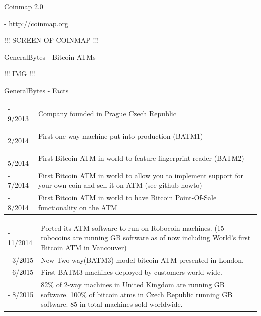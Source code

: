 \documentclass{beamer}
\begin{document}
\begin{frame}

    {\LARGE Coinmap 2.0}\\

    \vspace{5mm}

    - \url{http://coinmap.org}

    !!! SCREEN OF COINMAP !!!  %

\end{frame}

\begin{frame}

    {\LARGE GeneralBytes - Bitcoin ATMs}\\

    \vspace{5mm}

    !!! IMG !!!  %


\end{frame}

\begin{frame}

    {\LARGE GeneralBytes - Facts}\\

    \vspace{5mm}

    \begin{tabular}{lp{8cm}}
    - 9/2013 & Company founded in Prague Czech Republic\\
    - 2/2014 & First one-way machine put into production (BATM1)\\
    - 5/2014 & First Bitcoin ATM in world to feature fingerprint reader (BATM2)\\
    - 7/2014 & First Bitcoin ATM in world to allow you to implement support for your own coin and sell it on ATM (see github howto)\\
    - 8/2014 & First Bitcoin ATM in world to have Bitcoin Point-Of-Sale functionality on the ATM\\
    \end{tabular}

\end{frame}

\begin{frame}

    \begin{tabular}{lp{8cm}}
    - 11/2014 & Ported its ATM software to run on Robocoin machines. (15 robocoins are running GB software as of now including World’s first Bitcoin ATM in Vancouver)\\
    - 3/2015 & New Two-way(BATM3) model bitcoin ATM presented in London.\\
    - 6/2015 & First BATM3 machines deployed by customers world-wide.\\
    - 8/2015 & 82\% of 2-way machines in United Kingdom are running GB software. 100\% of bitcoin atms in Czech Republic running GB software. 85 in total machines sold worldwide.\\
    \end{tabular}

\end{frame}
\end{document}
